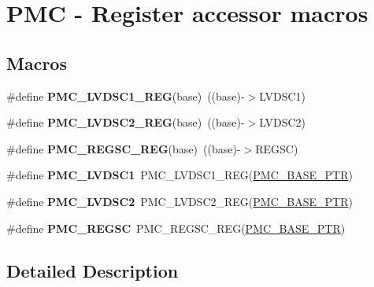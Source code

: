 \hypertarget{group___p_m_c___register___accessor___macros}{}\section{P\+MC -\/ Register accessor macros}
\label{group___p_m_c___register___accessor___macros}
\subsection*{Macros}
\begin{DoxyCompactItemize}
\item 
\mbox{\label{group___p_m_c___register___accessor___macros_gaf6a5650ee275b48943fd2a5f0845be4e}} 
\#define {\bfseries P\+M\+C\+\_\+\+L\+V\+D\+S\+C1\+\_\+\+R\+EG}(base)~((base)-\/$>$L\+V\+D\+S\+C1)
\item 
\mbox{\label{group___p_m_c___register___accessor___macros_ga691e6102ace21a6b54fabd256c5f0d7b}} 
\#define {\bfseries P\+M\+C\+\_\+\+L\+V\+D\+S\+C2\+\_\+\+R\+EG}(base)~((base)-\/$>$L\+V\+D\+S\+C2)
\item 
\mbox{\label{group___p_m_c___register___accessor___macros_ga56808559a3b60498b6604642202faaea}} 
\#define {\bfseries P\+M\+C\+\_\+\+R\+E\+G\+S\+C\+\_\+\+R\+EG}(base)~((base)-\/$>$R\+E\+G\+SC)
\item 
\mbox{\label{group___p_m_c___register___accessor___macros_gae9e90b7b2d3c4f5e0950d074fecb2798}} 
\#define {\bfseries P\+M\+C\+\_\+\+L\+V\+D\+S\+C1}~P\+M\+C\+\_\+\+L\+V\+D\+S\+C1\+\_\+\+R\+EG(\hyperlink{group___p_m_c___peripheral_gaf32df9f1096263f10a5e8978a338b2ac}{P\+M\+C\+\_\+\+B\+A\+S\+E\+\_\+\+P\+TR})
\item 
\mbox{\label{group___p_m_c___register___accessor___macros_ga921b48d20e5bc7e7353ac2f59c8135ba}} 
\#define {\bfseries P\+M\+C\+\_\+\+L\+V\+D\+S\+C2}~P\+M\+C\+\_\+\+L\+V\+D\+S\+C2\+\_\+\+R\+EG(\hyperlink{group___p_m_c___peripheral_gaf32df9f1096263f10a5e8978a338b2ac}{P\+M\+C\+\_\+\+B\+A\+S\+E\+\_\+\+P\+TR})
\item 
\mbox{\label{group___p_m_c___register___accessor___macros_gad80edb8f69da1769b7367108d8c4f9be}} 
\#define {\bfseries P\+M\+C\+\_\+\+R\+E\+G\+SC}~P\+M\+C\+\_\+\+R\+E\+G\+S\+C\+\_\+\+R\+EG(\hyperlink{group___p_m_c___peripheral_gaf32df9f1096263f10a5e8978a338b2ac}{P\+M\+C\+\_\+\+B\+A\+S\+E\+\_\+\+P\+TR})
\end{DoxyCompactItemize}


\subsection{Detailed Description}
